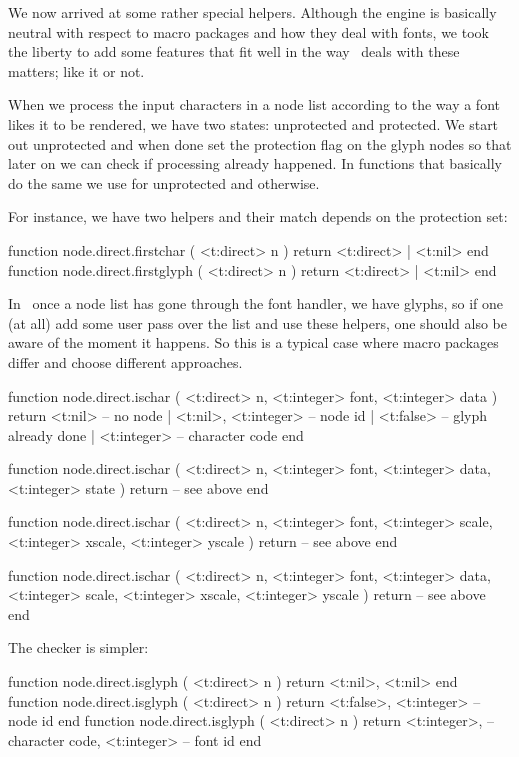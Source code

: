 We now arrived at some rather special helpers. Although the engine is basically
neutral with respect to macro packages and how they deal with fonts, we took the
liberty to add some features that fit well in the way \CONTEXT\ deals with these
matters; like it or not.

When we process the input characters in a node list according to the way a font
likes it to be rendered, we have two states: unprotected and protected. We start
out unprotected and when done set the protection flag on the glyph nodes so that
later on we can check if processing already happened. In functions that basically
do the same we use  for unprotected and  otherwise.

For instance, we have two helpers and their match depends on the protection set:

\starttyping[option=LUA]
function node.direct.firstchar  ( <t:direct> n ) return <t:direct> | <t:nil> end
function node.direct.firstglyph ( <t:direct> n ) return <t:direct> | <t:nil> end
\stoptyping

In \CONTEXT\ once a node list has gone through the font handler, we have glyphs,
so if one (at all) add some user pass over the list and use these helpers, one
should also be aware of the moment it happens. So this is a typical case where
macro packages differ and choose different approaches.

\starttyping[option=LUA]
function node.direct.ischar (
    <t:direct>  n, <t:integer> font,
    <t:integer> data
)
    return
        <t:nil>              -- no node
      | <t:nil>, <t:integer> -- node id
      | <t:false>            -- glyph already done
      | <t:integer>          -- character code
end

function node.direct.ischar (
    <t:direct>  n, <t:integer> font,
    <t:integer> data,
    <t:integer> state
)
    return -- see above
end

function node.direct.ischar (
    <t:direct>  n, <t:integer> font,
    <t:integer> scale, <t:integer> xscale, <t:integer> yscale
)
    return -- see above
end

function node.direct.ischar (
    <t:direct>  n, <t:integer> font,
    <t:integer> data,
    <t:integer> scale, <t:integer> xscale, <t:integer> yscale
)
    return -- see above
end
\stoptyping

The  checker is simpler:

\starttyping[option=LUA]
function node.direct.isglyph ( <t:direct> n )
    return
        <t:nil>,
        <t:nil>
end
function node.direct.isglyph ( <t:direct> n )
    return
        <t:false>,
        <t:integer> -- node id
end
function node.direct.isglyph ( <t:direct> n )
    return
        <t:integer>, -- character code,
        <t:integer>  -- font id
end
\stoptyping

